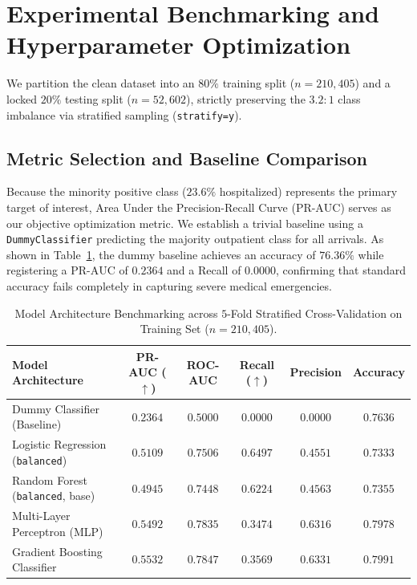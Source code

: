 \documentclass{article}
\begin{document}
\section{Experimental Benchmarking and Hyperparameter Optimization}
\label{sec:experiments}

We partition the clean dataset into an $80\%$ training split ($n=210,405$) and a locked $20\%$ testing split ($n=52,602$), strictly preserving the $3.2:1$ class imbalance via stratified sampling (\texttt{stratify=y}).

\subsection{Metric Selection and Baseline Comparison}
Because the minority positive class ($23.6\%$ hospitalized) represents the primary target of interest, Area Under the Precision-Recall Curve ($\text{PR-AUC}$) serves as our objective optimization metric. We establish a trivial baseline using a \texttt{DummyClassifier} predicting the majority outpatient class for all arrivals. As shown in Table~\ref{tab:benchmark}, the dummy baseline achieves an accuracy of $76.36\%$ while registering a $\text{PR-AUC}$ of $0.2364$ and a Recall of $0.0000$, confirming that standard accuracy fails completely in capturing severe medical emergencies.

\begin{table}[htbp]
  \caption{Model Architecture Benchmarking across $5$-Fold Stratified Cross-Validation on Training Set ($n=210,405$).}
  \label{tab:benchmark}
  \centering
  \begin{tabular}{lccccc}
    \toprule
    \textbf{Model Architecture} & \textbf{PR-AUC} ($\uparrow$) & \textbf{ROC-AUC} & \textbf{Recall} ($\uparrow$) & \textbf{Precision} & \textbf{Accuracy} \\
    \midrule
    Dummy Classifier (Baseline) & $0.2364$ & $0.5000$ & $0.0000$ & $0.0000$ & $0.7636$ \\
    Logistic Regression (\texttt{balanced}) & $0.5109$ & $0.7506$ & $0.6497$ & $0.4551$ & $0.7333$ \\
    Random Forest (\texttt{balanced}, base) & $0.4945$ & $0.7448$ & $0.6224$ & $0.4563$ & $0.7355$ \\
    Multi-Layer Perceptron (MLP) & $0.5492$ & $0.7835$ & $0.3474$ & $0.6316$ & $0.7978$ \\
    Gradient Boosting Classifier & $0.5532$ & $0.7847$ & $0.3569$ & $0.6331$ & $0.7991$ \\
    \bottomrule
  \end{tabular}
\end{table}
\end{document}
